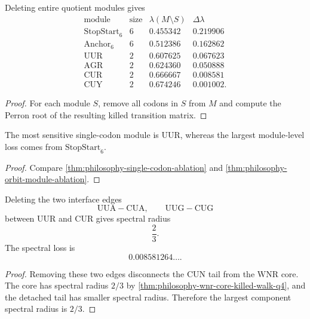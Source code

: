 \begin{theorem}
\label{thm:philosophy-orbit-module-ablation}
Deleting entire quotient modules gives
$$
\begin{array}{c|r|r|r}
  \text{module} & \text{size} & \lambda(M\setminus S) & \Delta\lambda\\
  \hline
  \mathrm{StopStart}_{6} & 6 & 0.455342 & 0.219906\\
  \mathrm{Anchor}_{6} & 6 & 0.512386 & 0.162862\\
  \mathrm{UUR} & 2 & 0.607625 & 0.067623\\
  \mathrm{AGR} & 2 & 0.624360 & 0.050888\\
  \mathrm{CUR} & 2 & 0.666667 & 0.008581\\
  \mathrm{CUY} & 2 & 0.674246 & 0.001002.
\end{array}
$$
\end{theorem}
\begin{proof}
For each module $S$, remove all codons in $S$ from $M$ and compute the
Perron root of the resulting killed transition matrix.
\end{proof}

\begin{corollary}
\label{cor:philosophy-point-module-sensitivity-differ}
The most sensitive single-codon module is $\mathrm{UUR}$, whereas the
largest module-level loss comes from $\mathrm{StopStart}_{6}$.
\end{corollary}
\begin{proof}
Compare \autoref{thm:philosophy-single-codon-ablation} and
\autoref{thm:philosophy-orbit-module-ablation}.
\end{proof}

\begin{theorem}
\label{thm:philosophy-tail-coupling-ablation}
Deleting the two interface edges
$$
  \mathrm{UUA}-\mathrm{CUA},
  \qquad
  \mathrm{UUG}-\mathrm{CUG}
$$
between $\mathrm{UUR}$ and $\mathrm{CUR}$ gives spectral radius
$$
  \frac{2}{3}.
$$
The spectral loss is
$$
  0.008581264\ldots.
$$
\end{theorem}
\begin{proof}
Removing these two edges disconnects the $\mathrm{CUN}$ tail from the
$\mathrm{WNR}$ core. The core has spectral radius $2/3$ by
\autoref{thm:philosophy-wnr-core-killed-walk-q4}, and the detached tail
has smaller spectral radius. Therefore the largest component spectral
radius is $2/3$.
\end{proof}

